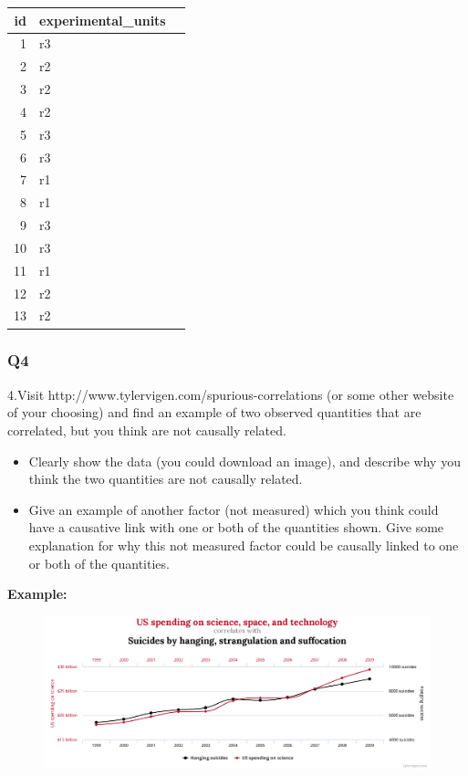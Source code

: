 \documentclass[11pt]{article}
\makeatletter
\def\maxwidth{\ifdim\Gin@nat@width>\linewidth\linewidth
    \else\Gin@nat@width\fi}
\let\Oldincludegraphics\includegraphics
\renewcommand{\includegraphics}[1]{\Oldincludegraphics[width=.8\maxwidth]{#1}}
\makeatother
\begin{document}
    \begin{tabular}{r|ll}
 id & experimental\_units\\
\hline
	  1 & r3\\
	  2 & r2\\
	  3 & r2\\
	  4 & r2\\
	  5 & r3\\
	  6 & r3\\
	  7 & r1\\
	  8 & r1\\
	  9 & r3\\
	 10 & r3\\
	 11 & r1\\
	 12 & r2\\
	 13 & r2\\
\end{tabular}


    
    \subsubsection*{Q4}\label{q4}

    4.Visit http://www.tylervigen.com/spurious-correlations (or some other
website of your choosing) and find an example of two observed quantities
that are correlated, but you think are not causally related.

\begin{itemize}
\item
  Clearly show the data (you could download an image), and describe why
  you think the two quantities are not causally related.
\item
  Give an example of another factor (not measured) which you think could
  have a causative link with one or both of the quantities shown. Give
  some explanation for why this not measured factor could be causally
  linked to one or both of the quantities.
\end{itemize}

    \textbf{Example: }

\begin{figure}[htbp]
\centering
\includegraphics{chart.png}
\caption{}
\end{figure}
\end{document}
